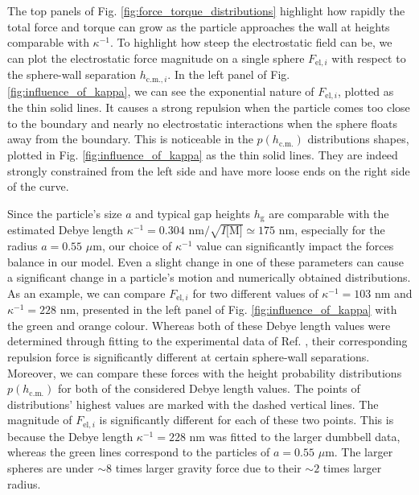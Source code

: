 \documentclass{master_thesis}
\begin{document}
The top panels of Fig. \ref{fig:force_torque_distributions} highlight how rapidly the total force and torque can grow as the particle approaches the wall at heights comparable with $\kappa^{-1}$. To highlight how steep the electrostatic field can be, we can plot the electrostatic force magnitude on a single sphere $F_{\textrm{el},i}$ with respect to the sphere-wall separation $h_{\textrm{c.m.},i}$. In the left panel of Fig. \ref{fig:influence_of_kappa}, we can see the exponential nature of $F_{\textrm{el},i}$, plotted as the thin solid lines. It causes a strong repulsion when the particle comes too close to the boundary and nearly no electrostatic interactions when the sphere floats away from the boundary. This is noticeable in the $p(h_{\textrm{c.m.}})$ distributions shapes, plotted in Fig. \ref{fig:influence_of_kappa} as the thin solid lines. They are indeed strongly constrained from the left side and have more loose ends on the right side of the curve.

Since the particle's size $a$ and typical gap heights $h_{\textrm{g}}$ are comparable with the estimated Debye length $\kappa^{-1}=0.304\textrm{ nm}/\sqrt{I\textrm{[M]}}\simeq 175$ nm, especially for the radius $a=0.55$ $\mu$m, our choice of $\kappa^{-1}$ value can significantly impact the forces balance in our model. Even a slight change in one of these parameters can cause a significant change in a particle's motion and numerically obtained distributions. As an example, we can compare $F_{\textrm{el},i}$ for two different values of $\kappa^{-1}=103$ nm and $\kappa^{-1}=228$ nm, presented in the left panel of Fig. \ref{fig:influence_of_kappa} with the green and orange colour. Whereas both of these Debye length values were determined through fitting to the experimental data of Ref. \cite{verweij2021}, their corresponding repulsion force is significantly different at certain sphere-wall separations. Moreover, we can compare these forces with the height probability distributions $p(h_{\textrm{c.m.}})$ for both of the considered Debye length values. The points of distributions' highest values are marked with the dashed vertical lines. The magnitude of $F_{\textrm{el},i}$ is significantly different for each of these two points. This is because the Debye length $\kappa^{-1}=228$ nm was fitted to the larger dumbbell data, whereas the green lines correspond to the particles of $a=0.55$ $\mu$m. The larger spheres are under $\sim 8$ times larger gravity force due to their $\sim 2$ times larger radius.
\end{document}

